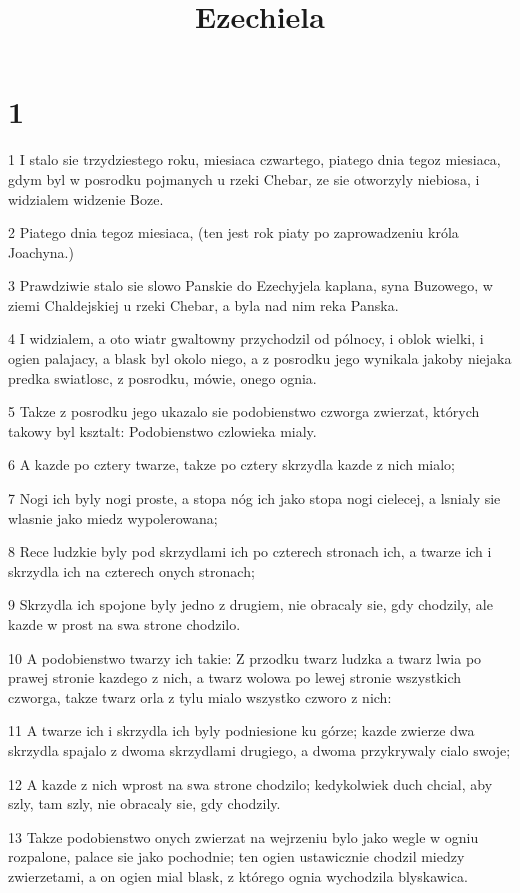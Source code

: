 

\title{Ezechiela}


\chapter{1}

\par 1 I stalo sie trzydziestego roku, miesiaca czwartego, piatego dnia tegoz miesiaca, gdym byl w posrodku pojmanych u rzeki Chebar, ze sie otworzyly niebiosa, i widzialem widzenie Boze.
\par 2 Piatego dnia tegoz miesiaca, (ten jest rok piaty po zaprowadzeniu króla Joachyna.)
\par 3 Prawdziwie stalo sie slowo Panskie do Ezechyjela kaplana, syna Buzowego, w ziemi Chaldejskiej u rzeki Chebar, a byla nad nim reka Panska.
\par 4 I widzialem, a oto wiatr gwaltowny przychodzil od pólnocy, i oblok wielki, i ogien palajacy, a blask byl okolo niego, a z posrodku jego wynikala jakoby niejaka predka swiatlosc, z posrodku, mówie, onego ognia.
\par 5 Takze z posrodku jego ukazalo sie podobienstwo czworga zwierzat, których takowy byl ksztalt: Podobienstwo czlowieka mialy.
\par 6 A kazde po cztery twarze, takze po cztery skrzydla kazde z nich mialo;
\par 7 Nogi ich byly nogi proste, a stopa nóg ich jako stopa nogi cielecej, a lsnialy sie wlasnie jako miedz wypolerowana;
\par 8 Rece ludzkie byly pod skrzydlami ich po czterech stronach ich, a twarze ich i skrzydla ich na czterech onych stronach;
\par 9 Skrzydla ich spojone byly jedno z drugiem, nie obracaly sie, gdy chodzily, ale kazde w prost na swa strone chodzilo.
\par 10 A podobienstwo twarzy ich takie: Z przodku twarz ludzka a twarz lwia po prawej stronie kazdego z nich, a twarz wolowa po lewej stronie wszystkich czworga, takze twarz orla z tylu mialo wszystko czworo z nich:
\par 11 A twarze ich i skrzydla ich byly podniesione ku górze; kazde zwierze dwa skrzydla spajalo z dwoma skrzydlami drugiego, a dwoma przykrywaly cialo swoje;
\par 12 A kazde z nich wprost na swa strone chodzilo; kedykolwiek duch chcial, aby szly, tam szly, nie obracaly sie, gdy chodzily.
\par 13 Takze podobienstwo onych zwierzat na wejrzeniu bylo jako wegle w ogniu rozpalone, palace sie jako pochodnie; ten ogien ustawicznie chodzil miedzy zwierzetami, a on ogien mial blask, z którego ognia wychodzila blyskawica.
